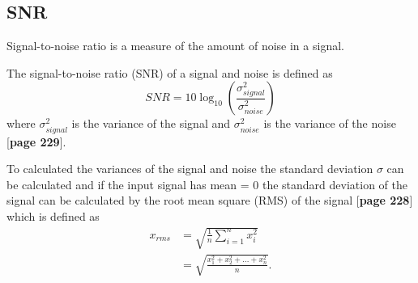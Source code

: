 \subsection{SNR}
Signal-to-noise ratio is a measure of the amount of noise in a signal.
\begin{definition}
The signal-to-noise ratio (SNR) of a signal and noise is defined as
\begin{equation}\label{def:SNR}
	SNR=10\log_{10}\left(\frac{\sigma_{signal}^2}{\sigma_{noise}^2}\right)
\end{equation}
where $\sigma_{signal}^2$ is the variance of the signal and $\sigma_{noise}^2$ is the variance of the noise [\textbf{page 229}\cite{DTSP}].
\end{definition}
To calculated the variances of the signal and noise the standard deviation $\sigma$ can be calculated and if the input signal has mean = 0 the standard deviation of the signal can be calculated by the root mean square (RMS) of the signal [\textbf{page 228}\cite{DTSP}] which is defined as
\begin{align}\label{eq:RMS}
	x_{rms} 
	&=\sqrt{\frac{1}{n} \sum_{i=1}^n x_i^2}\\
	&= \sqrt{\frac{x_1^2 + x_2^2 + \dots + x_n^2}{n}}.
\end{align}





